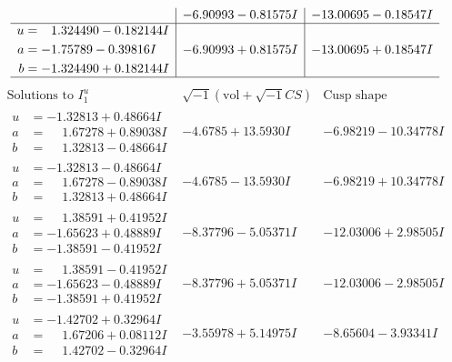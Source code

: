 \documentclass[1p]{elsarticle_modified}
\theoremstyle{definition}
\newcommand{\I}{\sqrt{-1}}
\begin{document}
$$\begin{array}{c|c|c}
 & -6.90993 - 0.81575 I & -13.00695 - 0.18547 I \\ \hline\begin{aligned}
u &= \phantom{-}1.324490 - 0.182144 I \\
a &= -1.75789 - 0.39816 I \\
b &= -1.324490 + 0.182144 I\end{aligned}
 & -6.90993 + 0.81575 I & -13.00695 + 0.18547 I\\
 \hline 
 \end{array}$$\newpage$$\begin{array}{c|c|c}  
\text{Solutions to }I^u_{1}& \I (\text{vol} + \sqrt{-1}CS) & \text{Cusp shape}\\
 \hline 
\begin{aligned}
u &= -1.32813 + 0.48664 I \\
a &= \phantom{-}1.67278 + 0.89038 I \\
b &= \phantom{-}1.32813 - 0.48664 I\end{aligned}
 & -4.6785 + 13.5930 I & -6.98219 - 10.34778 I \\ \hline\begin{aligned}
u &= -1.32813 - 0.48664 I \\
a &= \phantom{-}1.67278 - 0.89038 I \\
b &= \phantom{-}1.32813 + 0.48664 I\end{aligned}
 & -4.6785 - 13.5930 I & -6.98219 + 10.34778 I \\ \hline\begin{aligned}
u &= \phantom{-}1.38591 + 0.41952 I \\
a &= -1.65623 + 0.48889 I \\
b &= -1.38591 - 0.41952 I\end{aligned}
 & -8.37796 - 5.05371 I & -12.03006 + 2.98505 I \\ \hline\begin{aligned}
u &= \phantom{-}1.38591 - 0.41952 I \\
a &= -1.65623 - 0.48889 I \\
b &= -1.38591 + 0.41952 I\end{aligned}
 & -8.37796 + 5.05371 I & -12.03006 - 2.98505 I \\ \hline\begin{aligned}
u &= -1.42702 + 0.32964 I \\
a &= \phantom{-}1.67206 + 0.08112 I \\
b &= \phantom{-}1.42702 - 0.32964 I\end{aligned}
 & -3.55978 + 5.14975 I & -8.65604 - 3.93341 I \\ \hline\begin{aligned}

\end{aligned}
\end{array}$$
\end{document}
